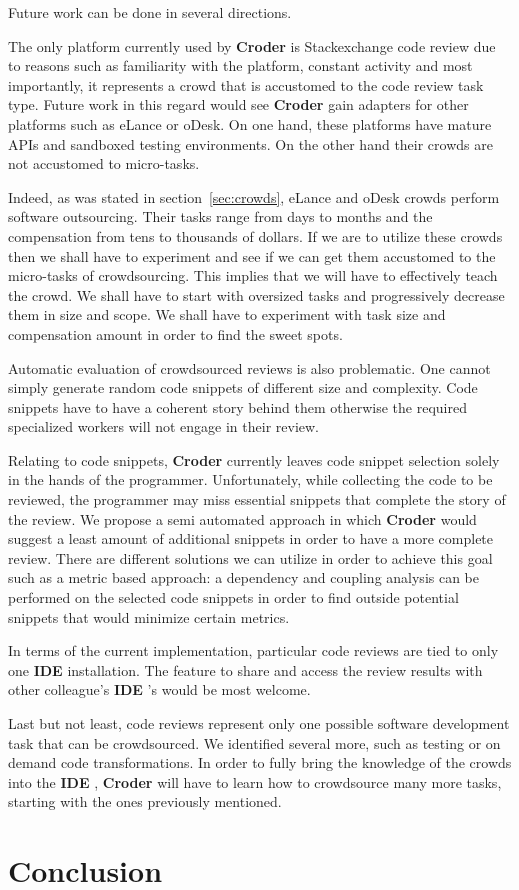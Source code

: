 \documentclass{sigchi}
\newcommand{\croder}{\textbf{Croder }}
\newcommand{\IDE}{\textbf{IDE }}
\begin{document}
Future work can be done in several directions.

The only platform currently used by \croder is Stackexchange code review due to reasons such as familiarity with the platform, constant activity and most importantly, it represents a crowd that is accustomed to the code review task type.
Future work in this regard would see \croder gain adapters for other platforms such as eLance or oDesk. On one hand, these platforms have mature APIs and sandboxed testing environments. On the other hand their crowds are not accustomed to micro-tasks.

Indeed, as was stated in section~\ref{sec:crowds}, eLance and oDesk crowds perform software outsourcing. Their tasks range from days to months and the compensation from tens to thousands of dollars. If we are to utilize these crowds then we shall have to experiment and see if we can get them accustomed to the micro-tasks of crowdsourcing. This implies that we will have to effectively teach the crowd. We shall have to start with oversized tasks and progressively decrease them in size and scope. We shall have to experiment with task size and compensation amount in order to find the sweet spots.

Automatic evaluation of crowdsourced reviews is also problematic. One cannot simply generate random code snippets of different size and complexity. Code snippets have to have a coherent story behind them otherwise the required specialized workers will not engage in their review.

Relating to code snippets, \croder currently leaves code snippet selection solely in the hands of the programmer. Unfortunately, while collecting the code to be reviewed, the programmer may miss essential snippets that complete the story of the review. We propose a semi automated approach in which \croder would suggest a least amount of additional snippets in order to have a more complete review. There are different solutions we can utilize in order to achieve this goal such as a metric based approach: a dependency and coupling analysis can be performed on the selected code snippets in order to find outside potential snippets that would minimize certain metrics.

In terms of the current implementation, particular code reviews are tied to only one \IDE installation. The feature to share and access the review results with other colleague's \IDE's would be most welcome.

Last but not least, code reviews represent only one possible software development task that can be crowdsourced. We identified several more, such as testing or on demand code transformations. In order to fully bring the knowledge of the crowds into the \IDE, \croder will have to learn how to crowdsource many more tasks, starting with the ones previously mentioned.


\section{Conclusion}



\end{document}
